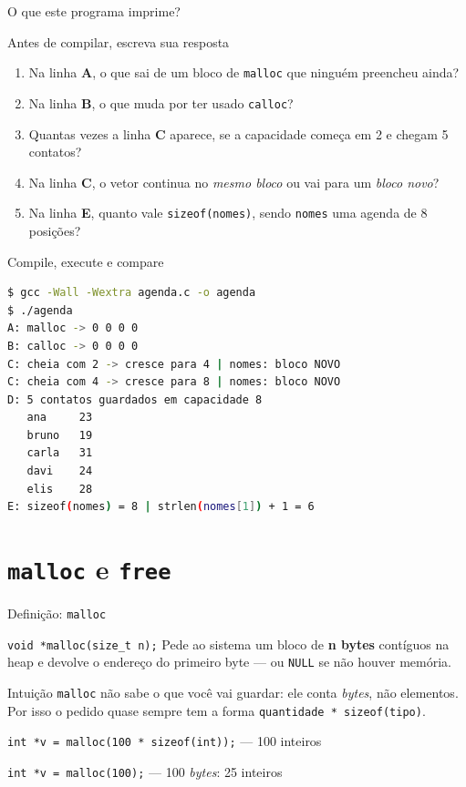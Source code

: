 \documentclass[aspectratio=169]{beamer}
\begin{document}
\begin{frame}{O que este programa imprime?}
  \begin{block}{Antes de compilar, escreva sua resposta}
    \begin{enumerate}
      \item Na linha \textbf{A}, o que sai de um bloco de \texttt{malloc} que
        ninguém preencheu ainda?
      \item Na linha \textbf{B}, o que muda por ter usado \texttt{calloc}?
      \item Quantas vezes a linha \textbf{C} aparece, se a capacidade começa em
        2 e chegam 5 contatos?
      \item Na linha \textbf{C}, o vetor continua no \emph{mesmo bloco} ou vai
        para um \emph{bloco novo}?
      \item Na linha \textbf{E}, quanto vale \texttt{sizeof(nomes)}, sendo
        \texttt{nomes} uma agenda de 8 posições?
    \end{enumerate}
  \end{block}
\end{frame}

\begin{frame}[fragile]{Compile, execute e compare}
\begin{lstlisting}[basicstyle=\ttfamily\scriptsize, numbers=none, language=bash]
$ gcc -Wall -Wextra agenda.c -o agenda
$ ./agenda
A: malloc -> 0 0 0 0
B: calloc -> 0 0 0 0
C: cheia com 2 -> cresce para 4 | nomes: bloco NOVO
C: cheia com 4 -> cresce para 8 | nomes: bloco NOVO
D: 5 contatos guardados em capacidade 8
   ana     23
   bruno   19
   carla   31
   davi    24
   elis    28
E: sizeof(nomes) = 8 | strlen(nomes[1]) + 1 = 6
\end{lstlisting}
\end{frame}

\section{\texttt{malloc} e \texttt{free}}

\begin{frame}{Definição: \texttt{malloc}}
  \begin{block}{\texttt{void *malloc(size\_t n);}}
    Pede ao sistema um bloco de \textbf{n bytes} contíguos na heap e devolve o
    endereço do primeiro byte --- ou \texttt{NULL} se não houver memória.
  \end{block}
  \begin{exampleblock}{Intuição}
    \texttt{malloc} não sabe o que você vai guardar: ele conta \emph{bytes},
    não elementos. Por isso o pedido quase sempre tem a forma
    \texttt{quantidade * sizeof(tipo)}.

    \medskip
    \texttt{int *v = malloc(100 * sizeof(int));} \quad --- 100 inteiros

    \texttt{int *v = malloc(100);} \quad --- 100 \emph{bytes}: 25 inteiros
  \end{exampleblock}
\end{frame}
\end{document}
